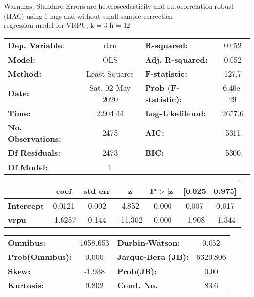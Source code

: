 Warnings: \newline
 [1] Standard Errors are heteroscedasticity and autocorrelation robust (HAC) using 1 lags and without small sample correction\\ 

regression model for VRPU, k = 3 h = 12\begin{center}
\begin{tabular}{lclc}
\toprule
\textbf{Dep. Variable:}    &       rtrn       & \textbf{  R-squared:         } &     0.052   \\
\textbf{Model:}            &       OLS        & \textbf{  Adj. R-squared:    } &     0.052   \\
\textbf{Method:}           &  Least Squares   & \textbf{  F-statistic:       } &     127.7   \\
\textbf{Date:}             & Sat, 02 May 2020 & \textbf{  Prob (F-statistic):} &  6.46e-29   \\
\textbf{Time:}             &     22:04:44     & \textbf{  Log-Likelihood:    } &    2657.6   \\
\textbf{No. Observations:} &        2475      & \textbf{  AIC:               } &    -5311.   \\
\textbf{Df Residuals:}     &        2473      & \textbf{  BIC:               } &    -5300.   \\
\textbf{Df Model:}         &           1      & \textbf{                     } &             \\
\bottomrule
\end{tabular}
\begin{tabular}{lcccccc}
                   & \textbf{coef} & \textbf{std err} & \textbf{z} & \textbf{P$> |$z$|$} & \textbf{[0.025} & \textbf{0.975]}  \\
\midrule
\textbf{Intercept} &       0.0121  &        0.002     &     4.852  &         0.000        &        0.007    &        0.017     \\
\textbf{vrpu}      &      -1.6257  &        0.144     &   -11.302  &         0.000        &       -1.908    &       -1.344     \\
\bottomrule
\end{tabular}
\begin{tabular}{lclc}
\textbf{Omnibus:}       & 1058.653 & \textbf{  Durbin-Watson:     } &    0.052  \\
\textbf{Prob(Omnibus):} &   0.000  & \textbf{  Jarque-Bera (JB):  } & 6320.806  \\
\textbf{Skew:}          &  -1.938  & \textbf{  Prob(JB):          } &     0.00  \\
\textbf{Kurtosis:}      &   9.802  & \textbf{  Cond. No.          } &     83.6  \\
\bottomrule
\end{tabular}
\end{center}

